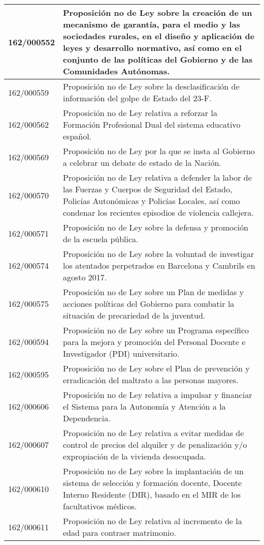 {\begin{table}[H]
\begin{center}
\begin{tabularx}{\linewidth}{| l | X |}
\hline
162/000552 & Proposición no de Ley sobre la creación de un mecanismo de garantía, para el medio y las sociedades rurales, en el diseño y aplicación de leyes y desarrollo normativo, así como en el conjunto de las políticas del Gobierno y de las Comunidades Autónomas. \\
\hline
162/000559 & Proposición no de Ley sobre la desclasificación de información del golpe de Estado del 23-F. \\
\hline
162/000562 & Proposición no de Ley relativa a reforzar la Formación Profesional Dual del sistema educativo español. \\
\hline
162/000569 & Proposición no de Ley por la que se insta al Gobierno a celebrar un debate de estado de la Nación. \\
\hline
162/000570 & Proposición no de Ley relativa a defender la labor de las Fuerzas y Cuerpos de Seguridad del Estado, Policías Autonómicas y Policías Locales, así como condenar los recientes episodios de violencia callejera. \\
\hline
162/000571 & Proposición no de Ley sobre la defensa y promoción de la escuela pública. \\
\hline
162/000574 & Proposición no de Ley sobre la voluntad de investigar los atentados perpetrados en Barcelona y Cambrils en agosto 2017. \\
\hline
162/000575 & Proposición no de Ley sobre un Plan de medidas y acciones políticas del Gobierno para combatir la situación de precariedad de la juventud. \\
\hline
162/000594 & Proposición no de Ley sobre un Programa específico para la mejora y promoción del Personal Docente e Investigador (PDI) universitario. \\
\hline
162/000595 & Proposición no de Ley sobre el Plan de prevención y erradicación del maltrato a las personas mayores. \\
\hline
162/000606 & Proposición no de Ley relativa a impulsar y financiar el Sistema para la Autonomía y Atención a la Dependencia. \\
\hline
162/000607 & Proposición no de Ley relativa a evitar medidas de control de precios del alquiler y de penalización y/o expropiación de la vivienda desocupada. \\
\hline
162/000610 & Proposición no de Ley sobre la implantación de un sistema de selección y formación docente, Docente Interno Residente (DIR), basado en el MIR de los facultativos médicos. \\
\hline
162/000611 & Proposición no de Ley relativa al incremento de la edad para contraer matrimonio. \\

\end{tabularx}
\end{center}
\end{table}}
